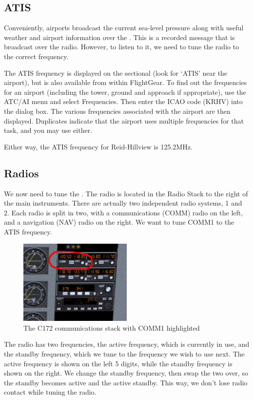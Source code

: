 \subsection{ATIS}

Conveniently, airports broadcast the current sea-level pressure along
with useful weather and airport information over the .
This is a recorded message that is broadcast over the radio.
However, to listen to it, we need to tune the radio to the correct frequency.

The ATIS frequency is displayed on the sectional (look for `ATIS' near the airport), but is also
available from within FlightGear. To find out the frequencies for an
airport (including the tower, ground and approach if appropriate),
use the ATC/AI menu and select Frequencies. Then enter the ICAO code
(KRHV) into the dialog box. The various frequencies associated with the
airport are then displayed. Duplicates indicate that the airport uses
multiple frequencies for that task, and you may use either.

Either way, the ATIS frequency for Reid-Hillview is 125.2MHz.

\subsection{Radios}

We now need to tune the . The radio is located in the Radio
Stack to the right of the main instruments. There are actually two
independent radio systems, 1 and 2.  Each radio is split in two,
with a communications (COMM) radio on the left, and a navigation
(NAV) radio on the right. We want to tune COMM1 to the ATIS frequency.

\begin{figure}[!htp]
\centering
\includegraphics[width=0.5\textwidth]{comm1}
\caption{The C172 communications stack with COMM1 highlighted\label{comm1}}
\end{figure}

The radio has two frequencies, the active frequency, which is currently in use,
and the standby frequency, which we tune to the frequency we wish to use next.
The active frequency is shown on the left 5 digits, while the standby frequency
is shown on the right. We change the standby frequency, then swap the two over,
so the standby becomes active and the active standby. This way, we don't lose
radio contact while tuning the radio.

